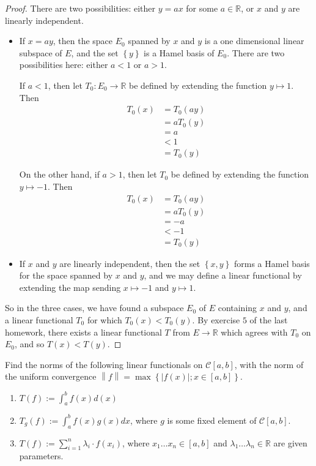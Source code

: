 \documentclass[12pt]{article}
\newcommand{\R}{\mathbb{R}}
\theoremstyle{definition}
\newenvironment{problem}[2][Problem]{\begin{trivlist}
\item[\hskip \labelsep {\bfseries #1}\hskip \labelsep {\bfseries #2.}]}{\end{trivlist}}
\begin{document}
\begin{proof}
	There are two possibilities: either $y = ax$ for some $a \in \R$, or $x$ and $y$ are linearly independent.
	\begin{itemize}
		\item If $x = ay$, then the space $E_0$ spanned by $x$ and $y$ is a one dimensional linear subspace of $E$, and the set $\left\{ y \right\}$ is a Hamel basis of $E_0$. There are two possibilities here: either $a < 1$ or $a > 1$. 
			\par If $a < 1$, then let $T_0 : E_0 \to \R$ be defined by extending the function $y \mapsto 1$. Then \begin{align*}
				T_0(x) &= T_0(ay)\\
				&= aT_0(y)\\
				&= a\\
				&< 1\\
				&= T_0(y)
			\end{align*}
			\par On the other hand, if $a > 1$, then let $T_0$ be defined by extending the function $y \mapsto -1$. Then
			\begin{align*}
				T_0(x) &= T_0(ay)\\
			&= aT_0(y)\\
			&= -a\\
			&< -1\\
		&= T_0(y)
			\end{align*}
		\item If $x$ and $y$ are linearly independent, then the set $\left\{ x,y \right\}$ forms a Hamel basis for the space spanned by $x$ and $y$, and we may define a linear functional by extending the map sending $x \mapsto -1$ and $y \mapsto 1$.
	\end{itemize}
	So in the three cases, we have found a subspace $E_0$ of $E$ containing $x$ and $y$, and a linear functional $T_0$ for which $T_0(x) < T_0(y)$. By exercise $5$ of the last homework, there exists a linear functional $T$ from $E \to \R$ which agrees with $T_0$ on $E_0$, and so $T(x) < T(y)$.
\end{proof}
\begin{problem}{3}
	Find the norms of the following linear functionals on $\mathcal{C}[a,b]$, with the norm of the uniform convergence $\left \lVert { f } \right \lVert  = \max\left\{ \left \lvert { f(x) } \right \lvert ; x \in [a,b] \right\}$.
	\begin{enumerate}[label=(\roman*)]
		\item $T(f) := \int_a^b f(x)d(x)$
		\item $T_g(f) := \int_a^bf(x)g(x)dx$, where $g$ is some fixed element of $\mathcal{C}[a,b]$.
		\item $T(f) := \sum_{i=1}^n \lambda_i \cdot f(x_i)$, where $x_1\dots x_n \in [a,b]$ and $\lambda_1 \dots \lambda_n \in \R$ are given parameters.
	\end{enumerate}
\end{problem}
\end{document}
